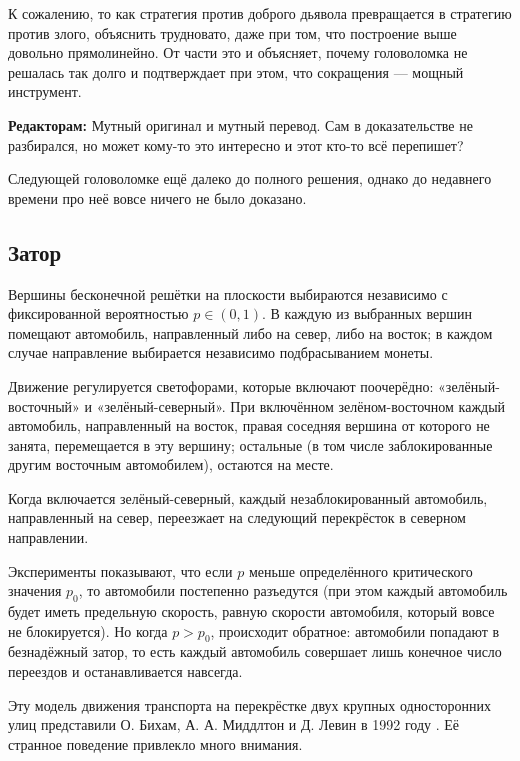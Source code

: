 К сожалению, то как стратегия против доброго дьявола превращается в стратегию против злого, объяснить трудновато, даже при том, что построение выше довольно прямолинейно.
От части это и объясняет, почему головоломка не решалась так долго и подтверждает при этом, что сокращения --- мощный инструмент.

\begin{addedbytheeditors}
\textbf{Редакторам:} Мутный оригинал и мутный перевод. Сам в доказательстве не разбирался, но может кому-то это интересно и этот кто-то всё перепишет?
\end{addedbytheeditors}


\medskip

Следующей головоломке ещё далеко до полного решения,
однако до недавнего времени про неё вовсе ничего не было доказано.

\subsection*{Затор}

Вершины бесконечной решётки на плоскости выбираются независимо с
фиксированной вероятностью $p\in (0,1)$.
В каждую из выбранных вершин
помещают автомобиль, направленный либо на север, либо на восток;
в каждом случае направление выбирается независимо подбрасыванием монеты.

Движение регулируется светофорами, которые включают поочерёдно:
«зелёный-восточный» и «зелёный-северный».
При включённом
зелёном-восточном каждый автомобиль, направленный на восток, правая
соседняя вершина от которого не занята, перемещается в эту вершину;
остальные (в том числе заблокированные другим восточным автомобилем),
остаются на месте.

Когда включается зелёный-северный, каждый незаблокированный
автомобиль, направленный на север, переезжает на следующий перекрёсток в
северном направлении.

Эксперименты показывают, что если $p$ меньше определённого
критического значения $p_0$, то автомобили постепенно разъедутся
(при этом каждый автомобиль будет иметь предельную скорость,
равную скорости автомобиля, который вовсе не блокируется).
Но когда
$p> p_0$, происходит обратное: автомобили попадают в безнадёжный
затор, то есть каждый автомобиль совершает лишь конечное число переездов
и останавливается навсегда.

Эту модель движения транспорта на перекрёстке двух крупных односторонних улиц представили О. Бихам, А. А. Миддлтон и Д. Левин в 1992 году \cite{6}.
Её странное поведение привлекло много внимания.

